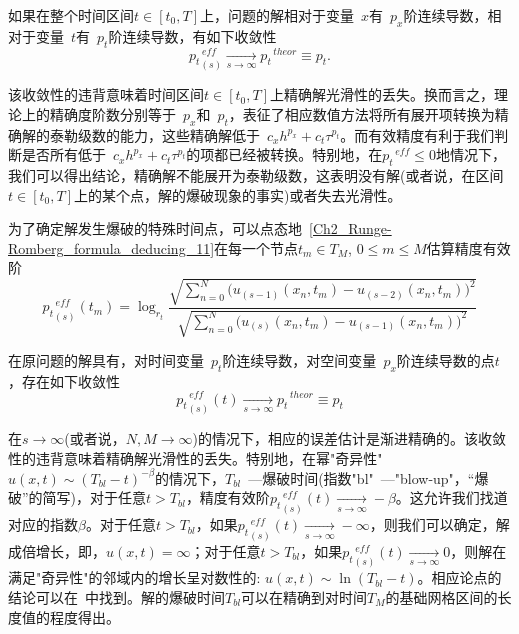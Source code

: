 \documentclass[twoside]{book}
\begin{document}
\begin{CJK*}{GBK}{song}
	如果在整个时间区间$t \in [t_0,T]$上，问题的解相对于变量~$x$有~$p_x$阶连续导数，相对于变量~$t$有~$p_t$阶连续导数，有如下收敛性
	\begin{equation*}
	\label{Ch2_convergence_1}
	{p_t}^{\, eff}_{(s)} \xrightarrow[s \to \infty]{} {p_t}^{\, theor} \equiv {p_t}.
	\end{equation*}
	
	该收敛性的违背意味着时间区间$t \in[t_0,T]$上精确解光滑性的丢失。换而言之，理论上的精确度阶数分别等于~$p_x$和~$p_t$，表征了相应数值方法将所有展开项转换为精确解的泰勒级数的能力，这些精确解低于~$c_xh^{p_x}+c_t\tau^{p_t}$。而有效精度有利于我们判断是否所有低于~$c_xh^{p_x}+c_t\tau^{p_t}$的项都已经被转换。特别地，在${p_t}^{\, eff} \leqslant 0 $地情况下，我们可以得出结论，精确解不能展开为泰勒级数，这表明没有解(或者说，在区间$t \in [t_0,T]$上的某个点，解的爆破现象的事实)或者失去光滑性。
	
	为了确定解发生爆破的特殊时间点，可以点态地~\eqref{Ch2_Runge-Romberg_formula_deducing_11}在每一个节点$t_m \in T_M$, $0 \leqslant m \leqslant M$估算精度有效阶
	\begin{equation}
	\label{Ch2_p_eff_for_every_time}
	{p_t}^{\, eff}_{(s)}(t_m) = \log_{r_t}{\dfrac{\sqrt{\sum\limits_{n = 0}^N \big(u_{(s - 1)}(x_n,t_m) - u_{(s - 2)}(x_n,t_m)\big)^2}}{\sqrt{\sum\limits_{n = 0}^N  \big(u_{(s)}(x_n,t_m) - u_{(s - 1)}(x_n,t_m)\big)^2}}}
	\end{equation}
	
	在原问题的解具有，对时间变量~$p_t$阶连续导数，对空间变量~$p_x$阶连续导数的点$t$，存在如下收敛性
	\begin{equation*}
	\label{convergence_2}
	{p_t}^{\, eff}_{(s)}(t) \xrightarrow[s \to \infty]{} {p_t}^{\, theor} \equiv {p_t}
	\end{equation*}
	
	在$s \to \infty$(或者说，$N,M \to \infty$)的情况下，相应的误差估计是渐进精确的。该收敛性的违背意味着精确解光滑性的丢失。特别地，在幂"奇异性"$u(x,t) \sim (T_{bl} - t)^{-\beta}$的情况下，$T_{bl}$~---爆破时间(指数"bl"~---"blow-up"，“爆破”的简写)，对于任意$t > T_{bl}$，精度有效阶${p_t}_{(s)}^{\, eff}(t) \xrightarrow[s \to \infty]{}  -\beta$。这允许我们找道对应的指数$\beta$。对于任意$t > T_{bl}$，如果${p_t}_{(s)}^{\, eff}(t) \xrightarrow[s \to \infty]{} -\infty$，则我们可以确定，解成倍增长，即，$u(x,t) = \infty$；对于任意$t > T_{bl}$，如果${p_t}_{(s)}^{\, eff}(t) \xrightarrow[s \to \infty]{} 0$，则解在满足"奇异性"的邻域内的增长呈对数性的: $u(x,t) \sim \ln(T_{bl}-t)$。相应论点的结论可以在~\cite{BUE_basic_1,BUE_basic_2}中找到。解的爆破时间$T_{bl}$可以在精确到对时间$T_M$的基础网格区间的长度值的程度得出。
	

\end{CJK*}
\end{document}
